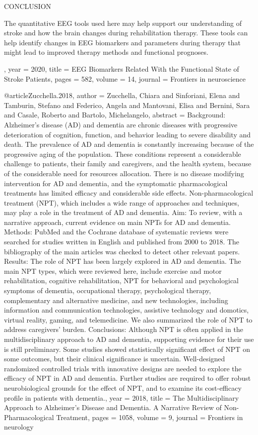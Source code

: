 {{CONCLUSION

The quantitative EEG tools used here may help support our understanding of stroke and how the brain changes during rehabilitation therapy. These tools can help identify changes in EEG biomarkers and parameters during therapy that might lead to improved therapy methods and functional prognoses.},
 year = {2020},
 title = {{EEG Biomarkers Related With the Functional State of Stroke Patients}},
 pages = {582},
 volume = {14},
 journal = {{Frontiers in neuroscience}}
}


@article{Zucchella.2018,
 author = {Zucchella, Chiara and Sinforiani, Elena and Tamburin, Stefano and Federico, Angela and Mantovani, Elisa and Bernini, Sara and Casale, Roberto and Bartolo, Michelangelo},
 abstract = {Background: Alzheimer's disease (AD) and dementia are chronic diseases with progressive deterioration of cognition, function, and behavior leading to severe disability and death. The prevalence of AD and dementia is constantly increasing because of the progressive aging of the population. These conditions represent a considerable challenge to patients, their family and caregivers, and the health system, because of the considerable need for resources allocation. There is no disease modifying intervention for AD and dementia, and the symptomatic pharmacological treatments has limited efficacy and considerable side effects. Non-pharmacological treatment (NPT), which includes a wide range of approaches and techniques, may play a role in the treatment of AD and dementia. Aim: To review, with a narrative approach, current evidence on main NPTs for AD and dementia. Methods: PubMed and the Cochrane database of systematic reviews were searched for studies written in English and published from 2000 to 2018. The bibliography of the main articles was checked to detect other relevant papers. Results: The role of NPT has been largely explored in AD and dementia. The main NPT types, which were reviewed here, include exercise and motor rehabilitation, cognitive rehabilitation, NPT for behavioral and psychological symptoms of dementia, occupational therapy, psychological therapy, complementary and alternative medicine, and new technologies, including information and communication technologies, assistive technology and domotics, virtual reality, gaming, and telemedicine. We also summarized the role of NPT to address caregivers' burden. Conclusions: Although NPT is often applied in the multidisciplinary approach to AD and dementia, supporting evidence for their use is still preliminary. Some studies showed statistically significant effect of NPT on some outcomes, but their clinical significance is uncertain. Well-designed randomized controlled trials with innovative designs are needed to explore the efficacy of NPT in AD and dementia. Further studies are required to offer robust neurobiological grounds for the effect of NPT, and to examine its cost-efficacy profile in patients with dementia.},
 year = {2018},
 title = {{The Multidisciplinary Approach to Alzheimer's Disease and Dementia. A Narrative Review of Non-Pharmacological Treatment}},
 pages = {1058},
 volume = {9},
 journal = {{Frontiers in neurology}}
}


